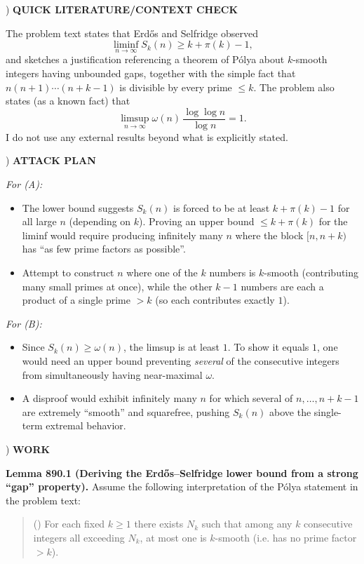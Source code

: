 ) \textbf{QUICK LITERATURE/CONTEXT CHECK}

\noindent The problem text states that Erd\H{o}s and Selfridge observed
\[
\liminf_{n\to\infty} S_k(n) \ge k+\pi(k)-1,
\]
and sketches a justification referencing a theorem of P\'{o}lya about $k$-smooth integers having unbounded gaps, together with the simple fact that $n(n+1)\cdots(n+k-1)$ is divisible by every prime $\le k$. The problem also states (as a known fact) that
\[
\limsup_{n\to\infty} \omega(n)\,\frac{\log\log n}{\log n} = 1.
\]
I do not use any external results beyond what is explicitly stated.

) \textbf{ATTACK PLAN}

\noindent \emph{For (A):}
\begin{itemize}
\item The lower bound suggests $S_k(n)$ is forced to be at least $k+\pi(k)-1$ for all large $n$ (depending on $k$). Proving an upper bound $\le k+\pi(k)$ for the liminf would require producing infinitely many $n$ where the block $[n,n+k)$ has ``as few prime factors as possible''.
\item Attempt to construct $n$ where one of the $k$ numbers is $k$-smooth (contributing many small primes at once), while the other $k-1$ numbers are each a product of a single prime $>k$ (so each contributes exactly $1$).
\end{itemize}

\noindent \emph{For (B):}
\begin{itemize}
\item Since $S_k(n)\ge \omega(n)$, the limsup is at least $1$. To show it equals $1$, one would need an upper bound preventing \emph{several} of the consecutive integers from simultaneously having near-maximal $\omega$.
\item A disproof would exhibit infinitely many $n$ for which several of $n,\dots,n+k-1$ are extremely ``smooth'' and squarefree, pushing $S_k(n)$ above the single-term extremal behavior.
\end{itemize}

) \textbf{WORK}

\noindent \textbf{Lemma 890.1 (Deriving the Erd\H{o}s--Selfridge lower bound from a strong ``gap'' property).}
Assume the following interpretation of the P\'{o}lya statement in the problem text:

\begin{quote}
(\*) For each fixed $k\ge 1$ there exists $N_k$ such that among any $k$ consecutive integers all exceeding $N_k$, at most one is $k$-smooth (i.e. has no prime factor $>k$).
\end{quote}

